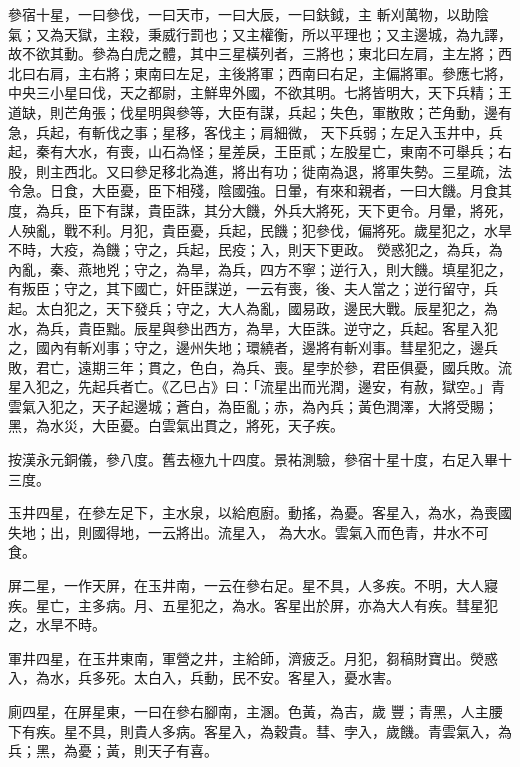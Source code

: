 \begin{pinyinscope}
 參宿十星，一曰參伐，一曰天市，一曰大辰，一曰鈇鉞，主
 斬刈萬物，以助陰氣；又為天獄，主殺，秉威行罰也；又主權衡，所以平理也；又主邊城，為九譯，故不欲其動。參為白虎之體，其中三星橫列者，三將也；東北曰左肩，主左將；西北曰右肩，主右將；東南曰左足，主後將軍；西南曰右足，主偏將軍。參應七將，中央三小星曰伐，天之都尉，主鮮卑外國，不欲其明。七將皆明大，天下兵精；王道缺，則芒角張；伐星明與參等，大臣有謀，兵起；失色，軍散敗；芒角動，邊有急，兵起，有斬伐之事；星移，客伐主；肩細微，
 天下兵弱；左足入玉井中，兵起，秦有大水，有喪，山石為怪；星差戾，王臣貳；左股星亡，東南不可舉兵；右股，則主西北。又曰參足移北為進，將出有功；徙南為退，將軍失勢。三星疏，法令急。日食，大臣憂，臣下相殘，陰國強。日暈，有來和親者，一曰大饑。月食其度，為兵，臣下有謀，貴臣誅，其分大饑，外兵大將死，天下更令。月暈，將死，人殃亂，戰不利。月犯，貴臣憂，兵起，民饑；犯參伐，偏將死。歲星犯之，水旱不時，大疫，為饑；守之，兵起，民疫；入，則天下更政。
 熒惑犯之，為兵，為內亂，秦、燕地兇；守之，為旱，為兵，四方不寧；逆行入，則大饑。填星犯之，有叛臣；守之，其下國亡，奸臣謀逆，一云有喪，後、夫人當之；逆行留守，兵起。太白犯之，天下發兵；守之，大人為亂，國易政，邊民大戰。辰星犯之，為水，為兵，貴臣黜。辰星與參出西方，為旱，大臣誅。逆守之，兵起。客星入犯之，國內有斬刈事；守之，邊州失地；環繞者，邊將有斬刈事。彗星犯之，邊兵敗，君亡，遠期三年；貫之，色白，為兵、喪。星孛於參，君臣俱憂，國兵敗。流
 星入犯之，先起兵者亡。《乙巳占》曰：「流星出而光潤，邊安，有赦，獄空。」青雲氣入犯之，天子起邊城；蒼白，為臣亂；赤，為內兵；黃色潤澤，大將受賜；黑，為水災，大臣憂。白雲氣出貫之，將死，天子疾。



 按漢永元銅儀，參八度。舊去極九十四度。景祐測驗，參宿十星十度，右足入畢十三度。



 玉井四星，在參左足下，主水泉，以給庖廚。動搖，為憂。客星入，為水，為喪國失地；出，則國得地，一云將出。流星入，
 為大水。雲氣入而色青，井水不可食。



 屏二星，一作天屏，在玉井南，一云在參右足。星不具，人多疾。不明，大人寢疾。星亡，主多病。月、五星犯之，為水。客星出於屏，亦為大人有疾。彗星犯之，水旱不時。



 軍井四星，在玉井東南，軍營之井，主給師，濟疲乏。月犯，芻稿財寶出。熒惑入，為水，兵多死。太白入，兵動，民不安。客星入，憂水害。



 廁四星，在屏星東，一曰在參右腳南，主溷。色黃，為吉，歲
 豐；青黑，人主腰下有疾。星不具，則貴人多病。客星入，為穀貴。彗、孛入，歲饑。青雲氣入，為兵；黑，為憂；黃，則天子有喜。




\end{pinyinscope}
